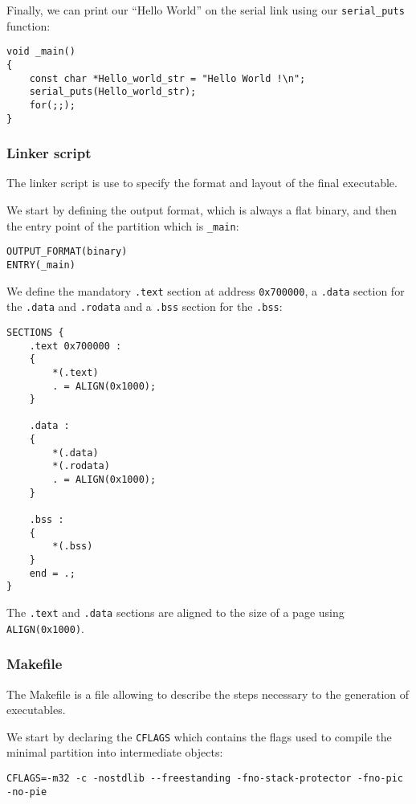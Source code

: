 \documentclass[10pt,a4paper,titlepage]{refart}
\begin{document}
Finally, we can print our ``Hello World'' on the serial link using our
\texttt{serial\_puts} function:

\begin{lstlisting}[style=CStyle]
void _main()
{
    const char *Hello_world_str = "Hello World !\n";
    serial_puts(Hello_world_str);
    for(;;);
}
\end{lstlisting}

\subsubsection{Linker script}

The linker script is use to specify the format and layout of the final
executable.

We start by defining the output format, which is always a flat binary, and then
the entry point of the partition which is \texttt{\_main}:

\begin{lstlisting}
OUTPUT_FORMAT(binary)
ENTRY(_main)
\end{lstlisting}

We define the mandatory \texttt{.text} section at address \texttt{0x700000},
a \texttt{.data} section for the \texttt{.data} and \texttt{.rodata} and a
\texttt{.bss} section for the \texttt{.bss}:

\begin{lstlisting}
SECTIONS {
    .text 0x700000 :
    {
        *(.text)
        . = ALIGN(0x1000);
    }

    .data :
    {
        *(.data)
        *(.rodata)
        . = ALIGN(0x1000);
    }

    .bss :
    {
        *(.bss)
    }
    end = .;
}
\end{lstlisting}

The \texttt{.text} and \texttt{.data} sections are aligned to the size of a page
using \texttt{ALIGN(0x1000)}.

\subsubsection{Makefile}

The Makefile is a file allowing to describe the steps necessary to the
generation of executables.

We start by declaring the \texttt{CFLAGS} which contains the flags used to
compile the minimal partition into intermediate objects:

\begin{lstlisting}
CFLAGS=-m32 -c -nostdlib --freestanding -fno-stack-protector -fno-pic -no-pie
\end{lstlisting}
\end{document}
